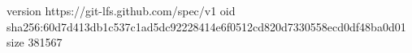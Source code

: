version https://git-lfs.github.com/spec/v1
oid sha256:60d7d413db1c537c1ad5dc92228414e6f0512cd820d7330558ecd0df48ba0d01
size 381567
